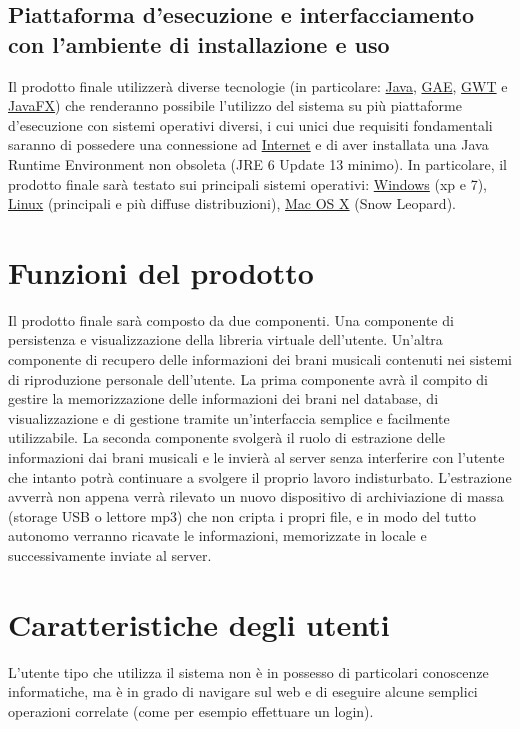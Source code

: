 \subsection{Piattaforma d'esecuzione e interfacciamento con l'ambiente di
installazione e uso}
Il prodotto finale utilizzer\`a diverse tecnologie (in particolare:
\underline{Java}, \underline{GAE}, \underline{GWT} e \underline{JavaFX}) che
renderanno possibile l'utilizzo del sistema su pi\`u piattaforme d'esecuzione con sistemi operativi diversi, i cui unici due requisiti
fondamentali saranno di possedere una connessione ad \underline{Internet} e di aver
installata una Java Runtime Environment non obsoleta (JRE 6 Update 13 minimo).
In particolare, il prodotto finale sar\`a testato sui principali sistemi operativi: \underline{Windows} (xp e 7), \underline{Linux} (principali e
pi\`u diffuse distribuzioni), \underline{Mac OS X} (Snow Leopard).
\section{Funzioni del prodotto}
Il prodotto finale sar\`a composto da due componenti. Una componente di
persistenza e visualizzazione della libreria virtuale dell'utente. Un'altra
componente di recupero delle informazioni dei brani musicali contenuti nei
sistemi di riproduzione personale dell'utente. La prima componente avr\`a il
compito di gestire la memorizzazione delle informazioni dei brani nel database,
di visualizzazione e di gestione tramite un'interfaccia semplice e facilmente
utilizzabile. La seconda componente svolger\`a il ruolo di estrazione delle
informazioni dai brani musicali e le invier\`a al server senza interferire con
l'utente che intanto potr\`a continuare a svolgere il proprio lavoro
indisturbato. L'estrazione avverr\`a non appena verr\`a rilevato un nuovo
dispositivo di archiviazione di massa (storage USB o lettore mp3)
che non cripta i propri file, e in modo del tutto autonomo verranno ricavate le
informazioni, memorizzate in locale e successivamente inviate al server.

\section{Caratteristiche degli utenti}
L'utente tipo che utilizza il sistema non \`e in possesso di particolari
conoscenze informatiche, ma \`e in grado di navigare sul web e di eseguire alcune
semplici operazioni correlate (come per esempio effettuare un login).

